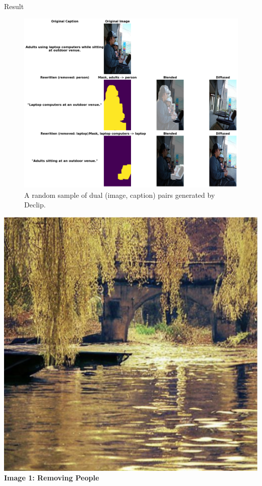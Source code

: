 \documentclass[final]{beamer}
\begin{document}
\begin{frame}[t]
\begin{columns}[t]
\begin{column}{0.3\textwidth}
\begin{block}{Result}
\begin{figure}
    \centering
    \includegraphics[width=0.8\linewidth]{poster/assets/preliminary.png}
    \caption{A random sample of dual (image, caption) pairs generated by Declip.}
\end{figure}
\begin{minipage}[t]{0.34\linewidth}
        \centering
        \includegraphics[width=\linewidth]{poster/assets/pic1.png}
         \small\textbf{Image 1: Removing People} 
    \end{minipage}
    \hfill
    \begin{minipage}[t]{0.4\linewidth}

\end{minipage}
\end{block}
\end{column}
\end{columns}
\end{frame}
\end{document}
